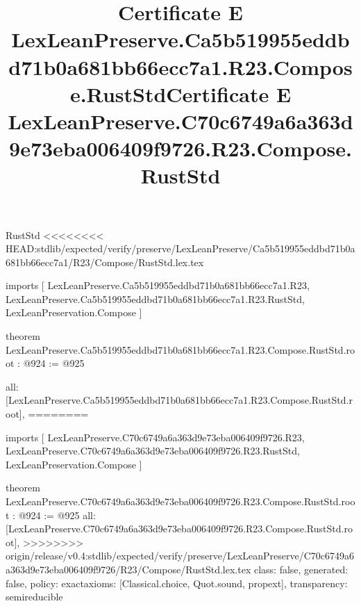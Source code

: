\begin{lexlean}{RustStd}
<<<<<<<< HEAD:stdlib/expected/verify/preserve/LexLeanPreserve/Ca5b519955eddbd71b0a681bb66ecc7a1/R23/Compose/RustStd.lex.tex
\title{Certificate E LexLeanPreserve.Ca5b519955eddbd71b0a681bb66ecc7a1.R23.Compose.RustStd}
\begin{coremodule}
imports [
  LexLeanPreserve.Ca5b519955eddbd71b0a681bb66ecc7a1.R23,
  LexLeanPreserve.Ca5b519955eddbd71b0a681bb66ecc7a1.R23.RustStd,
  LexLeanPreservation.Compose
]

theorem LexLeanPreserve.Ca5b519955eddbd71b0a681bb66ecc7a1.R23.Compose.RustStd.root : @924 := @925 {
  all: [LexLeanPreserve.Ca5b519955eddbd71b0a681bb66ecc7a1.R23.Compose.RustStd.root],
========
\title{Certificate E LexLeanPreserve.C70c6749a6a363d9e73eba006409f9726.R23.Compose.RustStd}
\begin{coremodule}
imports [
  LexLeanPreserve.C70c6749a6a363d9e73eba006409f9726.R23,
  LexLeanPreserve.C70c6749a6a363d9e73eba006409f9726.R23.RustStd,
  LexLeanPreservation.Compose
]

theorem LexLeanPreserve.C70c6749a6a363d9e73eba006409f9726.R23.Compose.RustStd.root : @924 := @925 {
  all: [LexLeanPreserve.C70c6749a6a363d9e73eba006409f9726.R23.Compose.RustStd.root],
>>>>>>>> origin/release/v0.4:stdlib/expected/verify/preserve/LexLeanPreserve/C70c6749a6a363d9e73eba006409f9726/R23/Compose/RustStd.lex.tex
  class: false,
  generated: false,
  policy: exact{axioms: [Classical.choice, Quot.sound, propext]},
  transparency: semireducible
}


\end{coremodule}}
\end{coremodule}
\end{lexlean}
